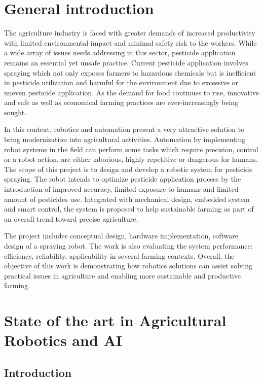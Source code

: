 \chapter*{General introduction }

The agriculture industry is faced with greater demands of increased productivity with limited environmental impact and minimal safety risk to the workers. While a wide array of issues needs addressing in this sector, pesticide application remains an essential yet unsafe practice. Current pesticide application involves spraying which not only exposes farmers to hazardous chemicals but is inefficient in pesticide utilization and harmful for the environment due to excessive or uneven pesticide application. As the demand for food continues to rise, innovative and safe as well as economical farming practices are ever-increasingly being sought.

In this context, robotics and automation present a very attractive solution to bring modernization into agricultural activities. Automation by implementing robot systems in the field can perform some tasks which require precision, control or a robot action, are either laborious, highly repetitive or dangerous for humans. The scope of this project is to design and develop a robotic system for pesticide spraying. The robot intends to optimize pesticide application process by the introduction of improved accuracy, limited exposure to humans and limited amount of pesticides use. Integrated with mechanical design, embedded system and smart control, the system is proposed to help sustainable farming as part of an overall trend toward precise agriculture.

The project includes conceptual design, hardware implementation, software design of a spraying robot. The work is also evaluating the system performance: efficiency, reliability, applicability in several farming contexts. Overall, the objective of this work is demonstrating how robotics solutions can assist solving practical issues in agriculture and enabling more sustainable and productive farming.

\chapter{State of the art in Agricultural Robotics and AI}

\section{Introduction}
